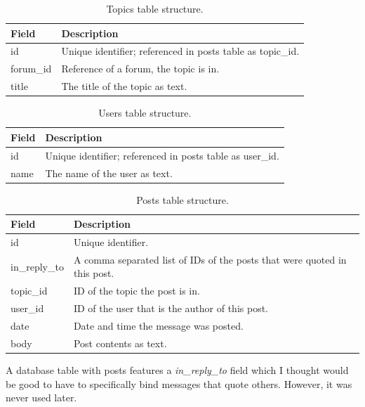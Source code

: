     \begin{table}[H]
      \begin{tabularx}{\textwidth}{|L{0.3}|L{1.7}|} \hline
         \textbf{Field} & \textbf{Description} \\\hline
        id & Unique identifier; referenced in posts table as topic\_id. \\
        forum\_id & Reference of a forum, the topic is in. \\
        title & The title of the topic as text. \\\hline
      \end{tabularx}
      \caption{Topics table structure.}
    \end{table}
    
    \begin{table}[H]
      \begin{tabularx}{\textwidth}{|L{0.3}|L{1.7}|} \hline
         \textbf{Field} & \textbf{Description} \\\hline
        id & Unique identifier; referenced in posts table as user\_id. \\
        name & The name of the user as text. \\\hline
      \end{tabularx}
      \caption{Users table structure.}
    \end{table}
    
    \begin{table}[H]
      \begin{tabularx}{\textwidth}{|L{0.3}|L{1.7}|} \hline
         \textbf{Field} & \textbf{Description} \\\hline
        id & Unique identifier. \\
        in\_reply\_to & A comma separated list of IDs of the posts that were quoted in this post. \\
        topic\_id & ID of the topic the post is in. \\
        user\_id & ID of the user that is the author of this post. \\
        date & Date and time the message was posted. \\
        body & Post contents as text. \\\hline
      \end{tabularx}
      \caption{Posts table structure.}
    \end{table}
    
    A database table with posts features a \emph{in\_reply\_to} field which I thought would be good to have to specifically bind messages that quote others. However, it was never used later.
    
